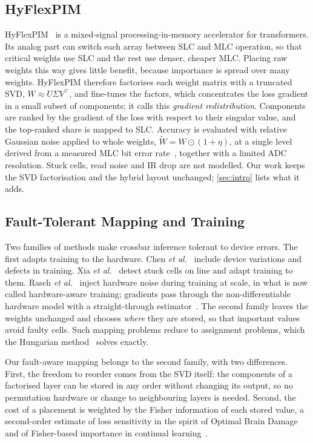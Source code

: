 \subsection{HyFlexPIM}
HyFlexPIM~\cite{song2025hyflexpim} is a mixed-signal processing-in-memory accelerator for
transformers. Its analog part can switch each array between SLC and MLC operation, so that critical
weights use SLC and the rest use denser, cheaper MLC. Placing raw weights this way gives little benefit,
because importance is spread over many weights. HyFlexPIM therefore factorises each weight matrix with a
truncated SVD, $W\approx U\Sigma V^{\top}$, and fine-tunes the factors, which concentrates the loss
gradient in a small subset of components; it calls this \emph{gradient redistribution}. Components are
ranked by the gradient of the loss with respect to their singular value, and the top-ranked share is
mapped to SLC. Accuracy is evaluated with relative Gaussian noise applied to whole weights,
$\tilde W=W\odot(1+\eta)$, at a single level derived from a measured MLC bit error
rate~\cite{fan2024mlc}, together with a limited ADC resolution. Stuck cells, read noise and IR drop are
not modelled. Our work keeps the SVD
factorisation and the hybrid layout unchanged; \cref{sec:intro} lists what it adds.

\subsection{Fault-Tolerant Mapping and Training}
Two families of methods make crossbar inference tolerant to device errors. The first adapts training to
the hardware. Chen \emph{et al.}~\cite{chen2017accelerator} include device variations and defects in
training. Xia \emph{et al.}~\cite{xia2017fault} detect stuck cells on line and adapt training to them.
Rasch \emph{et al.}~\cite{rasch2023hwa} inject hardware noise during training at scale, in what is now
called hardware-aware training; gradients pass through the non-differentiable hardware model with a
straight-through estimator~\cite{bengio2013ste}. The second family leaves the weights unchanged and
chooses \emph{where} they are stored, so that important values avoid faulty cells. Such mapping
problems reduce to assignment problems, which the Hungarian method~\cite{kuhn1955hungarian} solves
exactly.

Our fault-aware mapping belongs to the second family, with two differences. First, the freedom to
reorder comes from the SVD itself: the components of a factorised layer can be stored in any order
without changing its output, so no permutation hardware or change to neighbouring layers is needed.
Second, the cost of a placement is weighted by the Fisher information of each stored value, a
second-order estimate of loss sensitivity in the spirit of Optimal Brain
Damage~\cite{lecun1990obd} and of Fisher-based importance in continual
learning~\cite{kirkpatrick2017ewc}.
